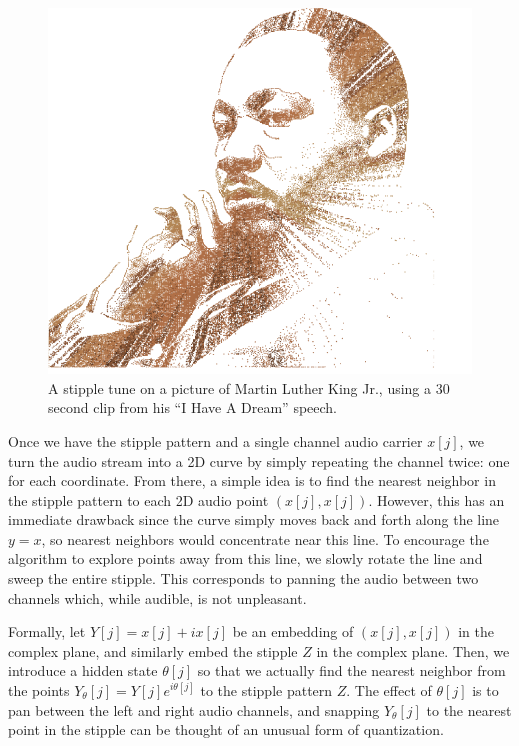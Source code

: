 \documentclass[runningheads]{llncs}
\begin{document}
\begin{figure}
  \centering
  \includegraphics[width=0.8\columnwidth]{mlkViterbiStipple.png}
  \caption{A stipple tune on a picture of Martin Luther King Jr., using a 30 second clip from his ``I Have A Dream'' speech.}
  \label{fig:mlkViterbiStipple}
\end{figure}

Once we have the stipple pattern and a single channel audio carrier $x[j]$, we turn the audio stream into a 2D curve by simply repeating the channel twice: one for each coordinate.  From there, a simple idea is to find the nearest neighbor in the stipple pattern to each 2D audio point $(x[j], x[j])$.  However, this has an immediate drawback since the curve simply moves back and forth along the line $y=x$, so nearest neighbors would concentrate near this line.  To encourage the algorithm to explore points away from this line, we slowly rotate the line and sweep the entire stipple.  This corresponds to panning the audio between two channels which, while audible, is not unpleasant.

Formally, let $Y[j] = x[j] + i x[j]$ be an embedding of $(x[j], x[j])$ in the complex plane, and similarly embed the stipple $Z$ in the complex plane.  Then, we introduce a hidden state $\theta[j]$ so that we actually find the nearest neighbor from the points $Y_{\theta}[j] = Y[j] e^{i \theta[j]}$ to the stipple pattern $Z$.  The effect of $\theta[j]$ is to pan between the left and right audio channels, and snapping $Y_{\theta}[j]$ to the nearest point in the stipple can be thought of an unusual form of quantization.  
\end{document}
